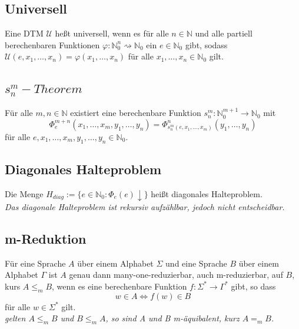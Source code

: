 \documentclass[DIV=15]{scrartcl}
\begin{document}
    \subsection{Universell}
        Eine DTM \(\mathcal{U}\) heßt universell, wenn es für alle \(n\in\mathbb{N}\) und alle partiell berechenbaren Funktionen \(\varphi:\mathbb{N}_0^n\rightsquigarrow\mathbb{N}_0\) 
        ein \(e\in\mathbb{N}_0\) gibt, sodass \(\mathcal{U}(e,x_1,\dots,x_n)=\varphi(x_1,\dots,x_n)\) für alle \(x_1,\dots,x_n\in\mathbb{N}_0\) gilt.
    \subsection{\(s_n^m-Theorem\)}
        Für alle \(m,n\in\mathbb{N}\) existiert eine berechenbare Funktion \(s_n^m:\mathbb{N}_0^{m+1}\to\mathbb{N}_0\) mit 
        \[\Phi_e^{m+n}(x_1,\dots,x_m,y_1,\dots,y_n)=\Phi^n_{s_n^m(e,x_1,\dots,x_m)}(y_1,\dots,y_n)\]
        für alle \(e,x_1,\dots,x_m,y_1,\dots,y_n\in\mathbb{N}_0\).
    \subsection{Diagonales Halteproblem}
        Die Menge \(H_{diag}:=\{e\in\mathbb{N}_0:\Phi_e(e)\downarrow\}\) heißt diagonales Halteproblem.\\
        \textit{Das diagonale Halteproblem ist rekursiv aufzählbar, jedoch nicht entscheidbar.}
    \subsection{m-Reduktion}
        Für eine Sprache \(A\) über einem Alphabet \(\Sigma\) und eine Sprache \(B\) über einem Alphabet \(\Gamma\)
        ist \(A\) genau dann many-one-reduzierbar, auch m-reduzierbar, auf \(B\), kurs \(A\leq_m B\), wenn es eine berechenbare Funktion 
        \(f:\Sigma^*\to\Gamma^*\) gibt, so dass
        \[w\in A\Leftrightarrow f(w)\in B\]
        für alle \(w\in\Sigma^*\) gilt.\\
        \textit{gelten \(A\leq_m B\) und \(B\leq_m A\), so sind A und B m-äquibalent, kurz \(A=_m B\).}
\end{document}
